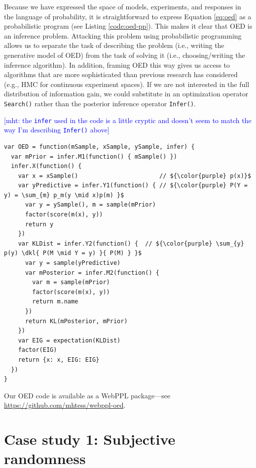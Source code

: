 \documentclass{article}
\newcommand{\dkl}{D_\mathrm{KL}\infdivx}
\newcommand{\mht}[1]{\textcolor{Blue}{[mht: #1]}}
\newcommand{\lou}[1]{\textcolor{orange}{[lou: #1]}}
\begin{document}
Because we have expressed the space of models, experiments, and responses in the language of probability, it is straightforward to express Equation \ref{eq:oed} as a probabilistic program (see Listing \ref{code:oed-pp}).
This makes it clear that OED is an inference problem.
Attacking this problem using probabilistic programming allows us to separate the task of describing the problem (i.e., writing the generative model of OED) from the task of solving it (i.e., choosing/writing the inference algorithm).
In addition, framing OED this way gives us access to algorithms that are more sophisticated than previous research has considered  (e.g., HMC for continuous experiment spaces).
If we are not interested in the full distribution of information gain, we could substitute in an optimization operator \lstinline{Search()} rather than the posterior inference operator \lstinline{Infer()}.

\mht{the \lstinline{infer} used in the code is a little cryptic and doesn't seem to match the way I'm describing \lstinline{Infer()} above}
\begin{lstlisting}[mathescape, label={code:oed-pp}, caption = {OED implementation. For clarity, we have omitted some book-keeping details.}]
var OED = function(mSample, xSample, ySample, infer) {
  var mPrior = infer.M1(function() { mSample() })
  infer.X(function() {
    var x = xSample()                       // ${\color{purple} p(x)}$
    var yPredictive = infer.Y1(function() { // ${\color{purple} P(Y = y) = \sum_{m} p_m(y \mid x)p(m) }$
      var y = ySample(), m = sample(mPrior)
      factor(score(m(x), y))
      return y
    })
    var KLDist = infer.Y2(function() {  // ${\color{purple} \sum_{y} p(y) \dkl{ P(M \mid Y = y) }{ P(M) } }$
      var y = sample(yPredictive)
      var mPosterior = infer.M2(function() {
        var m = sample(mPrior)
        factor(score(m(x), y))
        return m.name
      })
      return KL(mPosterior, mPrior)
    })
    var EIG = expectation(KLDist)
    factor(EIG)
    return {x: x, EIG: EIG}
  })
}
\end{lstlisting}
Our OED code is available as a WebPPL package---see \url{https://github.com/mhtess/webppl-oed}.

\section{Case study 1: Subjective randomness}
\label{s:tutorial}
\end{document}
